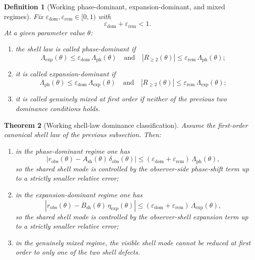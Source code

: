 \documentclass[12pt,a4paper]{article}
\newtheorem{theorem}{Theorem}[section]
\newtheorem{definition}[theorem]{Definition}
\begin{document}
\begin{definition}[Working phase-dominant, expansion-dominant, and mixed regimes]
Fix $\varepsilon_{\mathrm{dom}},\varepsilon_{\mathrm{rem}}\in[0,1)$ with
\[
 \varepsilon_{\mathrm{dom}}+\varepsilon_{\mathrm{rem}}<1.
\]
At a given parameter value $\theta$:
\begin{enumerate}[leftmargin=2em,label=(\roman*)]
\item the shell law is called \emph{phase-dominant} if
\[
 \Lambda_{\mathrm{exp}}(\theta)\le \varepsilon_{\mathrm{dom}}\,\Lambda_{\mathrm{ph}}(\theta)
 \quad\text{and}\quad
 |R_{\ge 2}(\theta)|\le \varepsilon_{\mathrm{rem}}\,\Lambda_{\mathrm{ph}}(\theta);
\]
\item it is called \emph{expansion-dominant} if
\[
 \Lambda_{\mathrm{ph}}(\theta)\le \varepsilon_{\mathrm{dom}}\,\Lambda_{\mathrm{exp}}(\theta)
 \quad\text{and}\quad
 |R_{\ge 2}(\theta)|\le \varepsilon_{\mathrm{rem}}\,\Lambda_{\mathrm{exp}}(\theta);
\]
\item it is called \emph{genuinely mixed at first order} if neither of the previous two dominance conditions holds.
\end{enumerate}
\end{definition}

\begin{theorem}[Working shell-law dominance classification]
Assume the first-order canonical shell law of the previous subsection. Then:
\begin{enumerate}[leftmargin=2em,label=(\roman*)]
\item in the phase-dominant regime one has
\[
 |r_{\mathrm{obs}}(\theta)-A_{\mathrm{sh}}(\theta)\,\delta_{\mathrm{obs}}(\theta)|
 \le (\varepsilon_{\mathrm{dom}}+\varepsilon_{\mathrm{rem}})\,\Lambda_{\mathrm{ph}}(\theta),
\]
so the shared shell mode is controlled by the observer-side phase-shift term up to a strictly smaller relative error;
\item in the expansion-dominant regime one has
\[
 |r_{\mathrm{obs}}(\theta)-B_{\mathrm{sh}}(\theta)\,\eta_{\mathrm{exp}}(\theta)|
 \le (\varepsilon_{\mathrm{dom}}+\varepsilon_{\mathrm{rem}})\,\Lambda_{\mathrm{exp}}(\theta),
\]
so the shared shell mode is controlled by the observer-shell expansion term up to a strictly smaller relative error;
\item in the genuinely mixed regime, the visible shell mode cannot be reduced at first order to only one of the two shell defects.
\end{enumerate}
\end{theorem}
\end{document}
